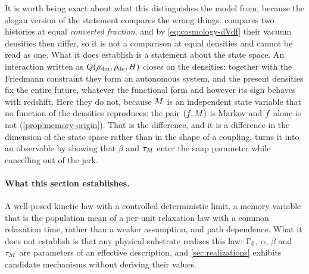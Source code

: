 It is worth being exact about what this distinguishes the model from, because
the slogan version of the statement compares the wrong things.
 compares two histories at equal \emph{converted
fraction}, and by \cref{eq:cosmology-dVdf} their vacuum densities then differ,
so it is not a comparison at equal densities and cannot be read as one. What it
does establish is a statement about the state space. An interaction written as
$Q(\rho_{\rm dm},\rho_{\rm de},H)$ closes on the densities: together with the
Friedmann constraint they form an autonomous system, and the present densities
fix the entire future, whatever the functional form and however its sign
behaves with redshift. Here they do not, because $M$ is an independent
state variable that no function of the densities reproduces: the pair
$(f,M)$ is Markov and $f$ alone is not
(\cref{prop:memory-origin}). That is the difference, and it is a difference in
the dimension of the state space rather than in the shape of a coupling.
 turns it into an observable by showing that $\beta$ and
$\tau_{M}$ enter the snap parameter while cancelling out of the jerk.

\paragraph{What this section establishes.}
A well-posed kinetic law with a controlled deterministic limit, a memory variable that is the population mean of a
per-unit relaxation law with a common relaxation time, rather than a weaker
assumption, and path dependence. What it does not
establish is that any physical substrate realises this law: $\Gamma_{0}$, $\alpha$,
$\beta$ and $\tau_{M}$ are parameters of an effective description, and
\cref{sec:realizations} exhibits candidate mechanisms without deriving their
values.
